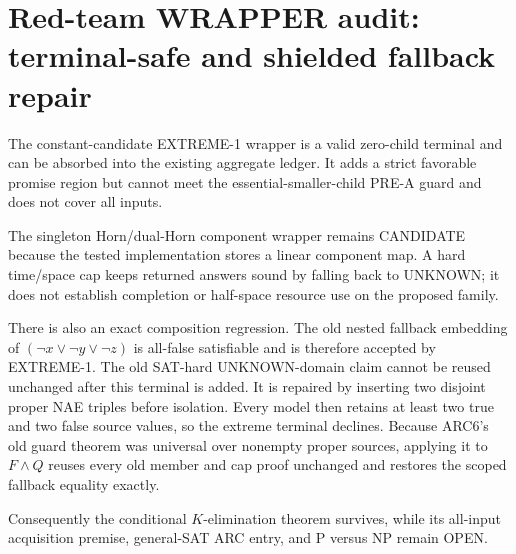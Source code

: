 \section{Red-team WRAPPER audit: terminal-safe and shielded fallback repair}

The constant-candidate \textsc{EXTREME-1} wrapper is a valid zero-child
terminal and can be absorbed into the existing aggregate ledger.  It adds a
strict favorable promise region but cannot meet the essential-smaller-child
PRE-A guard and does not cover all inputs.

The singleton Horn/dual-Horn component wrapper remains CANDIDATE because the
tested implementation stores a linear component map.  A hard time/space cap
keeps returned answers sound by falling back to UNKNOWN; it does not establish
completion or half-space resource use on the proposed family.

There is also an exact composition regression.  The old nested fallback
embedding of $(\neg x\vee\neg y\vee\neg z)$ is all-false satisfiable and is
therefore accepted by \textsc{EXTREME-1}.  The old SAT-hard UNKNOWN-domain
claim cannot be reused unchanged after this terminal is added.  It is repaired
by inserting two disjoint proper NAE triples before isolation.  Every model
then retains at least two true and two false source values, so the extreme
terminal declines.  Because ARC6's old guard theorem was universal over
nonempty proper sources, applying it to $F\wedge Q$ reuses every old member
and cap proof unchanged and restores the scoped fallback equality exactly.

Consequently the conditional $K$-elimination theorem survives, while its
all-input acquisition premise, general-SAT ARC entry, and P versus NP remain
OPEN.
